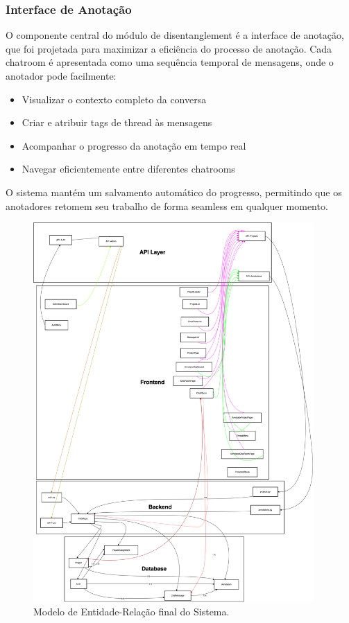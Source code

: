 \subsubsection{Interface de Anotação}
O componente central do módulo de disentanglement é a interface de anotação, que foi projetada para maximizar a eficiência do processo de anotação. Cada chatroom é apresentada como uma sequência temporal de mensagens, onde o anotador pode facilmente:
\begin{itemize}
    \item Visualizar o contexto completo da conversa
    \item Criar e atribuir tags de thread às mensagens
    \item Acompanhar o progresso da anotação em tempo real
    \item Navegar eficientemente entre diferentes chatrooms
\end{itemize}

O sistema mantém um salvamento automático do progresso, permitindo que os anotadores retomem seu trabalho de forma seamless em qualquer momento.


\begin{figure}[p]
    \centering
    \includegraphics[width=0.95\textwidth,height=0.95\textheight,keepaspectratio]{images/2A-ERT-B.drawio.png}
    \caption{Modelo de Entidade-Relação final do Sistema.}
    \label{fig:modelo-er}
\end{figure}

